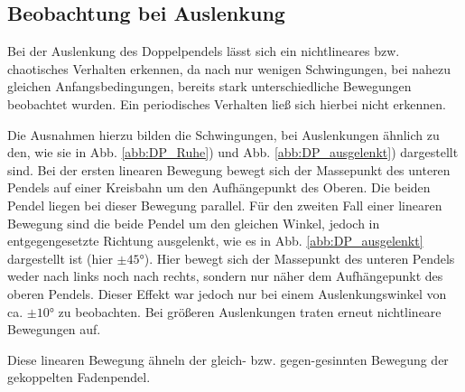 \documentclass[11pt,a4paper,titlepage, ngerman]{article}
\newcommand{\refabb}[1]{Abb. \ref{abb:#1}}
\begin{document}
		\subsection{Beobachtung bei Auslenkung}
		
			Bei der Auslenkung des Doppelpendels lässt sich ein nichtlineares bzw. chaotisches Verhalten erkennen, da nach nur wenigen Schwingungen, bei nahezu gleichen Anfangsbedingungen, bereits stark unterschiedliche Bewegungen beobachtet wurden. Ein periodisches Verhalten ließ sich hierbei nicht erkennen.
		
			Die Ausnahmen hierzu bilden die Schwingungen, bei Auslenkungen ähnlich zu den, wie sie in \refabb{DP_Ruhe}) und \refabb{DP_ausgelenkt}) dargestellt sind. Bei der ersten linearen Bewegung bewegt sich der Massepunkt des unteren Pendels auf einer Kreisbahn um den Aufhängepunkt des Oberen. Die beiden Pendel liegen bei dieser Bewegung parallel. Für den zweiten Fall einer linearen Bewegung sind die beide Pendel um den gleichen Winkel, jedoch in entgegengesetzte Richtung ausgelenkt, wie es in \refabb{DP_ausgelenkt} dargestellt ist (hier $\pm \ang{45}$). Hier bewegt sich der Massepunkt des unteren Pendels weder nach links noch nach rechts, sondern nur näher dem Aufhängepunkt des oberen Pendels. Dieser Effekt war jedoch nur bei einem Auslenkungswinkel von ca. $\pm \ang{10}$ zu beobachten. Bei größeren Auslenkungen traten erneut nichtlineare Bewegungen auf.
			
			Diese linearen Bewegung ähneln der gleich- bzw. gegen-gesinnten Bewegung der gekoppelten Fadenpendel.  
\end{document}
